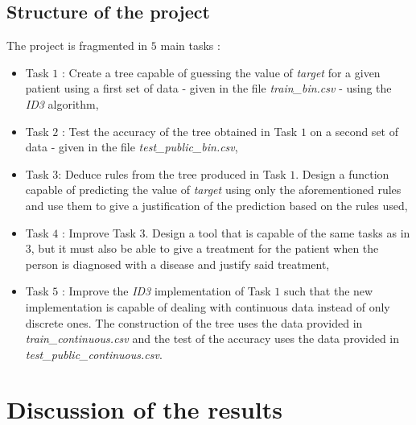 \documentclass[french]{article}
\begin{document}
\subsection{Structure of the project}
The project is fragmented in $5$ main tasks :
	\begin{itemize} 
		\item Task $1$ : Create a tree capable of guessing the value of \emph{target} for a given patient using a first set of data - given in the file \emph{train\_bin.csv} - using the \emph{ID3} algorithm,
		\item Task $2$ : Test the accuracy of the tree obtained in Task $1$ on a second set of data - given in the file \emph{test\_public\_bin.csv},
		\item Task $3 $: Deduce rules from the tree produced in Task $1$. Design a function capable of predicting the value of \emph{target} using only the aforementioned rules and use them to give a justification of the prediction based on the rules used,
		\item Task $4$ : Improve Task $3$. Design a tool that is capable of the same tasks as in $3$, but it must also be able to give a treatment for the patient when the person is diagnosed with a disease and justify said treatment,
		\item Task $5$ : Improve the \emph{ID3} implementation of Task $1$ such that the new implementation is capable of dealing with continuous data instead of only discrete ones. The construction of the tree uses the data provided in \emph{train\_continuous.csv} and the test of the accuracy uses the data provided in \emph{test\_public\_continuous.csv}.
	\end{itemize}

\section{Discussion of the results}
\end{document}
